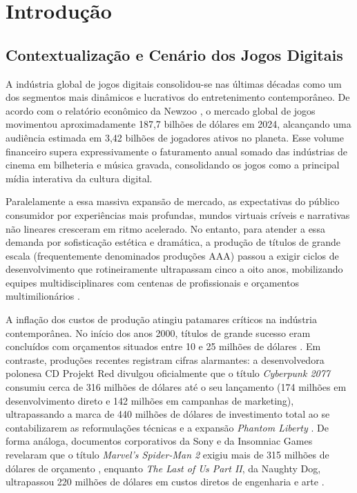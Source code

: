\chapter{Introdução}
\label{cap:introducao}

\section{Contextualização e Cenário dos Jogos Digitais}
\label{sec:contextualizacao}

A indústria global de jogos digitais consolidou-se nas últimas décadas como um dos segmentos mais dinâmicos e lucrativos do entretenimento contemporâneo. De acordo com o relatório econômico da Newzoo \cite{newzoo2024games}, o mercado global de jogos movimentou aproximadamente 187,7 bilhões de dólares em 2024, alcançando uma audiência estimada em 3,42 bilhões de jogadores ativos no planeta. Esse volume financeiro supera expressivamente o faturamento anual somado das indústrias de cinema em bilheteria e música gravada, consolidando os jogos como a principal mídia interativa da cultura digital.

Paralelamente a essa massiva expansão de mercado, as expectativas do público consumidor por experiências mais profundas, mundos virtuais críveis e narrativas não lineares cresceram em ritmo acelerado. No entanto, para atender a essa demanda por sofisticação estética e dramática, a produção de títulos de grande escala (frequentemente denominados produções AAA) passou a exigir ciclos de desenvolvimento que rotineiramente ultrapassam cinco a oito anos, mobilizando equipes multidisciplinares com centenas de profissionais e orçamentos multimilionários \cite{schreier2017blood}.

A inflação dos custos de produção atingiu patamares críticos na indústria contemporânea. No início dos anos 2000, títulos de grande sucesso eram concluídos com orçamentos situados entre 10 e 25 milhões de dólares \cite{schreier2017blood}. Em contraste, produções recentes registram cifras alarmantes: a desenvolvedora polonesa CD Projekt Red divulgou oficialmente que o título \textit{Cyberpunk 2077} consumiu cerca de 316 milhões de dólares até o seu lançamento (174 milhões em desenvolvimento direto e 142 milhões em campanhas de marketing), ultrapassando a marca de 440 milhões de dólares de investimento total ao se contabilizarem as reformulações técnicas e a expansão \textit{Phantom Liberty} \cite{cdprojekt2023report}. De forma análoga, documentos corporativos da Sony e da Insomniac Games revelaram que o título \textit{Marvel's Spider-Man 2} exigiu mais de 315 milhões de dólares de orçamento \cite{yinpoole2023spiderman}, enquanto \textit{The Last of Us Part II}, da Naughty Dog, ultrapassou 220 milhões de dólares em custos diretos de engenharia e arte \cite{totilo2023sony}.

